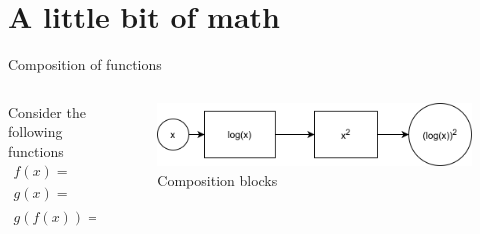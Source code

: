 \section{A little bit of math}

\begin{frame}{Composition of functions} 
	\begin{columns}
		\begin{column}{.5\textwidth}
			Consider the following  functions 
			\begin{align*}
				f(x)=& log(x) \\
				g(x)=&  x^2 \\
				g(f(x)) =& (log(x))^2 \\  
			\end{align*}
		\end{column}
		\begin{column}{.5\textwidth}
			\begin{figure}
				\includegraphics[width=.8\textwidth, center]{figures/function_composition}
				\caption*{Composition blocks}
			\end{figure}
		\end{column}
	\end{columns}

\end{frame}